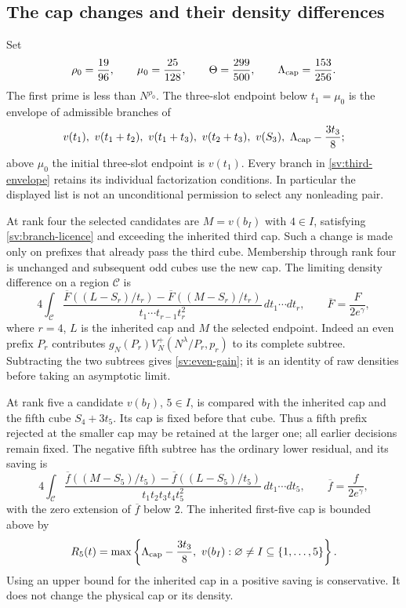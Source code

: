 \subsection{The cap changes and their density differences}

Set
\[
 \rho_0=\frac{19}{96},\qquad \mu_0=\frac{25}{128},\qquad
 \Theta=\frac{299}{500},\qquad \Lambda_{\rm cap}=\frac{153}{256}.
\]
The first prime is less than $N^{\rho_0}$.  The three-slot endpoint
below $t_1=\mu_0$ is the envelope of admissible branches of
\begin{equation}\label{sv:third-envelope}
 v(t_1),\ v(t_1+t_2),\ v(t_1+t_3),\ v(t_2+t_3),\ v(S_3),\
                         \Lambda_{\rm cap}-\frac{3t_3}{8};
\end{equation}
above $\mu_0$ the initial three-slot endpoint is $v(t_1)$.
Every branch in \eqref{sv:third-envelope} retains its individual
factorization conditions.  In particular the displayed list is not
an unconditional permission to select any nonleading pair.

At rank four the selected candidates are $M=v(b_I)$ with
$4\in I$, satisfying \eqref{sv:branch-licence} and exceeding the
inherited third cap.  Such a change is made only on prefixes that
already pass the third cube.  Membership through rank four is
unchanged and subsequent odd cubes use the new cap.
The limiting density difference on a region $\mathcal C$ is
\begin{equation}\label{sv:even-gain}
 4\int_{\mathcal C}
 \frac{\overline F((L-S_r)/t_r)
                   -\overline F((M-S_r)/t_r)}
      {t_1\cdots t_{r-1}t_r^2}\,dt_1\cdots dt_r,
 \qquad \overline F=\frac{F}{2e^\gamma},
\end{equation}
where $r=4$, $L$ is the inherited cap and $M$ the selected endpoint.
Indeed an even prefix $P_r$ contributes
$g_N(P_r)V_N^+(N^\lambda/P_r,p_r)$ to its complete subtree.
Subtracting the two subtrees gives \eqref{sv:even-gain}; it is an
identity of raw densities before taking an asymptotic limit.

At rank five a candidate $v(b_I)$, $5\in I$, is compared with the
inherited cap and the fifth cube $S_4+3t_5$.  Its cap is fixed before
that cube.  Thus a fifth prefix rejected at the smaller cap may be
retained at the larger one; all earlier decisions remain fixed.
The negative fifth subtree has the ordinary lower residual, and its
saving is
\begin{equation}\label{sv:odd-gain}
 4\int_{\mathcal C}
 \frac{\overline f((M-S_5)/t_5)
                   -\overline f((L-S_5)/t_5)}
      {t_1t_2t_3t_4t_5^2}\,dt_1\cdots dt_5,
 \qquad \overline f=\frac{f}{2e^\gamma},
\end{equation}
with the zero extension of $\overline f$ below $2$.
The inherited first-five cap is bounded above by
\begin{equation}\label{sv:fifth-envelope}
 R_5(t)=\max\left\{\Lambda_{\rm cap}-\frac{3t_3}{8},\
         v(b_I):\varnothing\ne I\subseteq\{1,\ldots,5\}\right\}.
\end{equation}
Using an upper bound for the inherited cap in a positive saving is
conservative.  It does not change the physical cap or its density.

